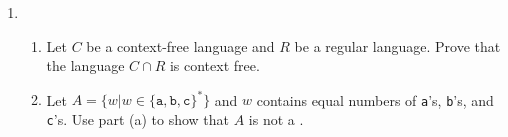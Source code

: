 \begin{enumerate}[start=18,font=\bfseries,label=2.\arabic*]


\item

\begin{enumerate}[font=\bfseries,label=\alph*.]
    \item Let $C$ be a context-free language and $R$ be a regular language. Prove that the language $C\cap R$ is context free.
    \item Let $A = \{w|w\in \{ \texttt{a},\texttt{b},\texttt{c} \}^\ast \}$ and $w$ contains equal numbers of \texttt{a}’s, \texttt{b}’s, and \texttt{c}’s. Use part (a) to show that $A$ is not a \cfl.
\end{enumerate}


\end{enumerate}

